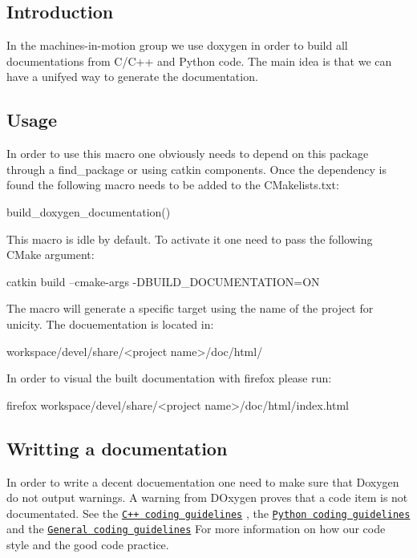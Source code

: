 \subsection*{Introduction}

In the machines-\/in-\/motion group we use doxygen in order to build all documentations from C/\+C++ and Python code. The main idea is that we can have a unifyed way to generate the documentation.

\subsection*{Usage}

In order to use this macro one obviously needs to depend on this package through a {\ttfamily find\+\_\+package} or using {\ttfamily catkin} components. Once the dependency is found the following macro needs to be added to the C\+Makelists.\+txt\+: \begin{DoxyVerb}build_doxygen_documentation()
\end{DoxyVerb}


This macro is idle by default. To activate it one need to pass the following C\+Make argument\+: \begin{DoxyVerb}catkin build --cmake-args -DBUILD_DOCUMENTATION=ON
\end{DoxyVerb}


The macro will generate a specific target using the name of the project for unicity. The docuementation is located in\+: \begin{DoxyVerb}workspace/devel/share/<project name>/doc/html/
\end{DoxyVerb}


In order to visual the built documentation with firefox please run\+: \begin{DoxyVerb}firefox workspace/devel/share/<project name>/doc/html/index.html
\end{DoxyVerb}


\subsection*{Writting a documentation}

In order to write a decent docuementation one need to make sure that Doxygen do not output warnings. A warning from D\+Oxygen proves that a code item is not documentated. See the \href{https://machines-in-motion.github.io/code_documentation/ci_example_cpp/coding_guidelines_1.html}{\tt C++ coding guidelines} , the \href{https://machines-in-motion.github.io/code_documentation/ci_example_python/coding_guidelines_1.html}{\tt Python coding guidelines} and the \href{https://machines-in-motion.github.io/code_documentation/ci_example_cpp/coding_guidelines_0.html}{\tt General coding guidelines} For more information on how our code style and the good code practice.


